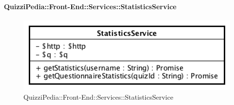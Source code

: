 \paragraph{QuizziPedia::Front-End::Services::StatisticsService}
\begin{figure}[ht]
	\centering
	\includegraphics[scale=0.60]{UML/Classi/Front-End/QuizziPedia_Front-end_Services_StatisticsService.png}
	\caption{QuizziPedia::Front-End::Services::StatisticsService}
\end{figure}\FloatBarrier

